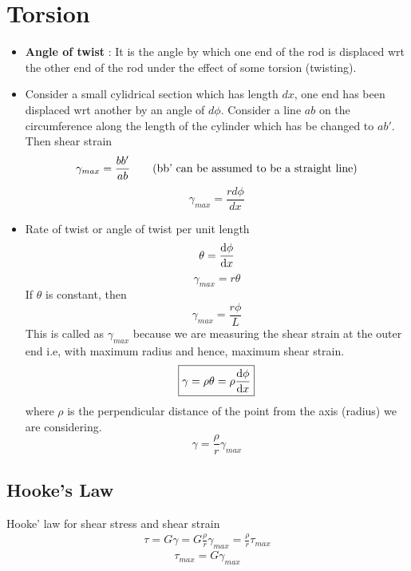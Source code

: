 \documentclass{article}
\begin{document}
\section{Torsion}
\label{torsion}
	\begin{itemize}
		\item \textbf{Angle of twist} : It is the angle by which one end of the rod is displaced wrt the other end of the rod under the effect of some torsion (twisting).
		\item Consider a small cylidrical section which has length $dx$, one end has been displaced wrt another by an angle of $d\phi$. Consider a line $ab$ on the circumference along the length of the cylinder which has be changed to $ab'$. Then shear strain 
		\begin{equation*}
			\gamma_{max} = \frac{bb'}{ab} \qquad (\text{bb' can be assumed to be a straight line})\\
		\end{equation*}
			\[\boxed{\gamma_{max} = \frac{r d\phi}{dx}}\]


		\item Rate of twist or angle of twist per unit length
		\[\theta = \dv{\phi}{x}\]
		\[\gamma_{max} = r \theta\]
		If $\theta$ is constant, then
		\[\gamma_{max}= \frac{r \phi}{L}\] 
		This is called as $\gamma_{max}$ because we are measuring the shear strain at the outer end i.e, with maximum radius and hence, maximum shear strain.
		\[\boxed{\gamma = \rho \theta = \rho \dv{\phi}{x}}\]
		where $\rho$ is the perpendicular distance of the point from the axis (radius) we are considering.
		\[\boxed{\gamma = \frac{\rho}{r} \gamma_{max} }\]

	\end{itemize}
	\subsection{Hooke's Law}
		Hooke' law for shear stress and shear strain
		\begin{align*}
			\tau = G \gamma
				 = G \frac{\rho}{r}\gamma_{max}
				 = \frac{\rho}{r}\tau_{max}
		\end{align*}
		\[\tau_{max} = G \gamma_{max}\]
\end{document}
